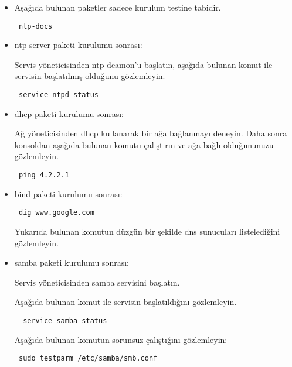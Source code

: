 \documentclass[a4paper,10pt]{article}
\begin{document}
\begin{itemize}
\item Aşağıda bulunan paketler sadece kurulum testine tabidir.

\begin{verbatim}
 ntp-docs
\end{verbatim}


\item ntp-server paketi kurulumu sonrası:

Servis yöneticisinden ntp deamon'u başlatın, aşağıda bulunan komut ile servisin başlatılmış olduğunu gözlemleyin.
\begin{verbatim}
 service ntpd status
\end{verbatim}


 \item dhcp paketi kurulumu sonrası:

Ağ yöneticisinden dhcp kullanarak bir ağa bağlanmayı deneyin. Daha sonra konsoldan aşağıda bulunan komutu çalıştırın ve ağa bağlı olduğununuzu gözlemleyin.
\begin{verbatim}
 ping 4.2.2.1
\end{verbatim}

\item bind paketi kurulumu sonrası:
\begin{verbatim}
 dig www.google.com
\end{verbatim}
Yukarıda bulunan komutun düzgün bir şekilde dns sunucuları listelediğini gözlemleyin.

\item samba paketi kurulumu sonrası:

Servis yöneticisinden samba servisini başlatın.

Aşağıda bulunan komut ile servisin başlatıldığını gözlemleyin.
\begin{verbatim}
  service samba status 
\end{verbatim}

 Aşağıda bulunan komutun sorunsuz çalıştığını gözlemleyin:
\begin{verbatim}
 sudo testparm /etc/samba/smb.conf
\end{verbatim}

\end{itemize}
\end{document}
